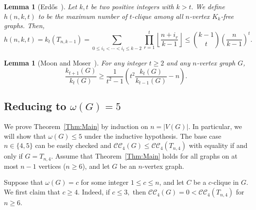 \documentclass[11pt,a4paper]{article}
\newtheorem{lem}[dfn]{Lemma}
\newcommand{\turangraph}[2]{T_{#1,#2}}
\newcommand{\coveropt}[2]{{\mathcal{C}\mathcal{C}_{#1}(#2)}}
\begin{document}
\begin{lem}[Erd\H{o}s~\cite{E62}]\label{Lem:Erdos}
	Let $k, t$ be two positive integers with $k>t.$
	We define $h(n,k,t)$ to be the maximum number of $t$-clique among all $n$-vertex $K_{k}$-free graphs.
	Then,
	$$
	h(n,k,t)
	= k_t(\turangraph{n}{k-1}) 
	=\sum_{0\leq i_1 < \cdots <i_t \leq k-2}
	\prod_{r=1}^{t} \left\lfloor \frac{n+i_r}{k-1} \right\rfloor
	\leq \binom{k-1}{t} \left(\frac{n}{k-1}\right)^t.
	$$
\end{lem}

\begin{lem}[Moon and Moser~\cite{MM}]\label{Lem:MM}
	For any integer $t\geq 2$
	and any $n$-vertex graph $G$,
	$$ \frac{k_{t+1}(G)}{k_t(G)} \geq \frac{1}{t^2-1} \left( t^2 \frac{k_t(G)}{k_{t-1}(G)}-n \right).
	$$
\end{lem}


\subsection{Reducing to $\omega(G)=5$}\label{Sec: Reducing to omega(G)=5}
We prove Theorem~\ref{Thm:Main} by induction on $n = |V(G)|$.
In particular, we will show that $\omega(G)\le 5$ under the inductive hypothesis.
The base case $n \in \{4,5\}$ can be easily checked and 
$\coveropt{4}{G} \leq \coveropt{4}{\turangraph{n}{4}}$ with equality if and only if $G = \turangraph{n}{4}$. 
Assume that Theorem~\ref{Thm:Main} holds for all graphs on at most $n-1$ vertices ($n \geq 6$), and let $G$ be an $n$-vertex graph.

Suppose that $\omega(G)=c$ for some integer $1\le c\le n$, 
and let $C$ be a $c$-clique in $G$.
We first claim that $c\ge 4.$
Indeed, if $c\le 3,$ 
then $\coveropt{4}{G}=0<\mathcal{C}\mathcal{C}_4(\turangraph{n}{4})$ for $n\ge 6.$
\end{document}
